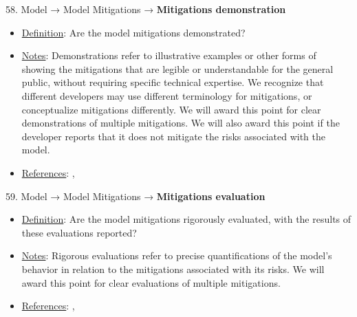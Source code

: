 58. Model → Model Mitigations → \textbf{Mitigations demonstration}
\vspace{-\parskip}
\begin{itemize}
	\item
	\underline{Definition}: Are the model mitigations demonstrated?
	\item
	\underline{Notes}: Demonstrations refer to illustrative examples or other forms of showing the mitigations that are legible or understandable for the general public, without requiring specific technical expertise. We recognize that different developers may use different terminology for mitigations, or conceptualize mitigations differently. We will award this point for clear demonstrations of multiple mitigations. We will also award this point if the developer reports that it does not mitigate the risks associated with the model.
	\item
	\underline{References}: \citet{solaiman2023evaluating}, \citet{weidinger2021ethical}
\end{itemize}


59. Model → Model Mitigations → \textbf{Mitigations evaluation}
\vspace{-\parskip}
\begin{itemize}
	\item
	\underline{Definition}: Are the model mitigations rigorously evaluated, with the results of these evaluations reported?
	\item
	\underline{Notes}: Rigorous evaluations refer to precise quantifications of the model's behavior in relation to the mitigations associated with its risks. We will award this point for clear evaluations of multiple mitigations.
	\item
	\underline{References}: \citet{huang2023catastrophic}, \citet{weidinger2021ethical}
\end{itemize}


